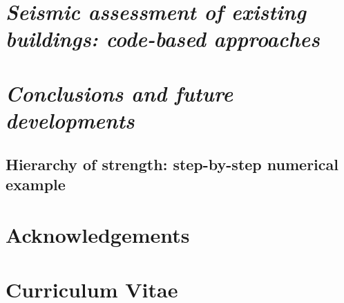 \documentclass[12pt,twoside,openright,british]{scrreprt}
\begin{document}
\chapter{\textit{Seismic assessment of existing buildings: code-based approaches}}
\label{chap:assessment}



\chapter*{\textit{Conclusions and future developments}}
\label{chap:conclusions}





   
        
\renewcommand{\bibname}{References}	%


\begin{appendices} %

\chapter{Hierarchy of strength: step-by-step numerical example}
\label{app:hierarchy}


\end{appendices}



\chapter*{Acknowledgements}

\chapter*{Curriculum Vitae}

\pagestyle{empty}

\end{document}
